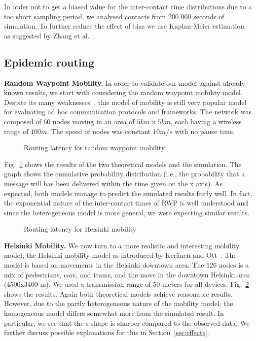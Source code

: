 \documentclass{article}
\begin{document}
In order not to get a biased value for the inter-contact time distributions
due to a too short sampling period, we analysed contacts from 200 000
seconds of simulation. To further reduce the effect of bias we use
Kaplan-Meier estimation as suggested by Zhang et
al.~\cite{zhang07}. 

\subsection{Epidemic routing}

{\bf Random Waypoint Mobility.} In order to validate our model against
already known results, we start with considering the random waypoint
mobility model. Despite its many
weaknesses~\cite{aschenbruck10,yoon03}, this model of mobility is
still very popular model for evaluating ad hoc communication protocols
and frameworks.  The network was composed of 60 nodes moving in an
area of $5km \times 5km$, each having a wireless range of $100m$. The
speed of nodes was constant $10m/s$ with no pause time.

\begin{figure}[htb]
  \centering
   \caption{Routing latency for random waypoint mobility}
  \label{fig:rwp}
\end{figure}


Fig.~\ref{fig:rwp} shows the results of the two theoretical models
and the simulation. The graph shows the cumulative probability
distribution (i.e., the probability that a message will has been
delivered within the time given on the x axis). As expected, both
models manage to predict the simulated results fairly well. In fact,
the exponential nature of the inter-contact times of RWP is well
understood and since the heterogeneous model is more general, we were
expecting similar results.

\begin{figure}[htb]
  \centering
   \caption{Routing latency for Helsinki mobility}
  \label{fig:helsinki}
\end{figure}

{\bf Helsinki Mobility.} We now turn to a more realistic and
interesting mobility model, the Helsinki mobility model as introduced
by Ker{\"a}nen and Ott~\cite{keraenen07increasing}. The model is based
on movements in the Helsinki downtown area. The 126 nodes is a mix of
pedestrians, cars, and trams, and the move in the downtown Helsinki
area (4500x3400 m). We used a transmission range of 50 meters for all
devices.  Fig.~\ref{fig:helsinki} shows the results. Again both
theoretical models achieve reasonable results. However, due to the
partly heterogeneous nature of the mobility model, the homogeneous
model differs somewhat more from the simulated result. In particular,
we see that the s-shape is sharper compared to the observed
data. We further discuss possible explanations for this in
Section~\ref{sec:effects}.
\end{document}
